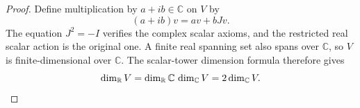 \begin{proof}
Define multiplication by $a+ib\in\mathbb C$ on $V$ by
\[
  (a+ib)v=av+bJv.
\]
The equation $J^2=-I$ verifies the complex scalar axioms, and the restricted real scalar action is
the original one. A finite real spanning set also spans over $\mathbb C$, so $V$ is
finite-dimensional over $\mathbb C$. The scalar-tower dimension formula therefore gives
\[
  \dim_{\mathbb R} V=\dim_{\mathbb R}\mathbb C\,\dim_{\mathbb C}V=2\dim_{\mathbb C}V.
\]
\end{proof}
